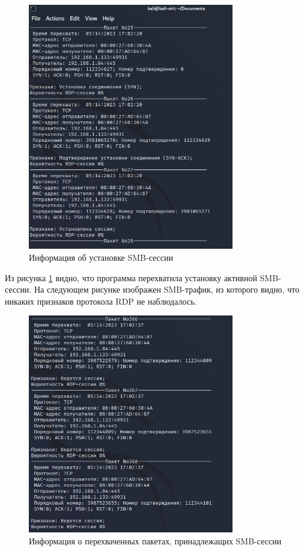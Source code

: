 \documentclass[bachelor, och, coursework]{SCWorks}
\begin{document}
\begin{figure}[H]
  \centering
  \includegraphics[width=0.8\textwidth]{photo/smb1.jpg}
  \caption{Информация об установке SMB-сессии}
  \label{smb1}
\end{figure}

Из рисунка \ref{smb1} видно, что программа перехватила установку активной SMB-сессии. На следующем рисунке изображен SMB-трафик,
из которого видно, что никаких признаков протокола RDP не наблюдалось.


\begin{figure}[H]
  \centering
  \includegraphics[width=0.8\textwidth]{photo/smb2.jpg}
  \caption{Информация о перехваченных пакетах, принадлежащих SMB-сессии}
  \label{smb2}
\end{figure}
\end{document}
